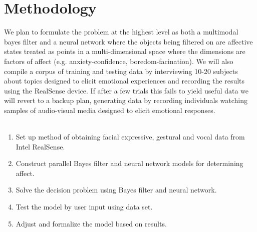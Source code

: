\documentclass[12pt,letterpaper]{article}
\begin{document}
\section{Methodology}
We plan to formulate the problem at the highest level as both a multimodal bayes filter and a neural network where the objects being filtered on are affective states treated as points in a multi-dimensional space where the dimensions are factors of affect (e.g. anxiety-confidence, boredom-facination).  We will also compile a corpus of training and testing data by interviewing 10-20 subjects about topics designed to elicit emotional experiences and recording the results using the RealSense device.  If after a few trials this fails to yield useful data we will revert to a backup plan, generating data by recording individuals watching samples of audio-visual media designed to elicit emotional responses.\\ \\

\begin{enumerate}
\item Set up method of obtaining facial expressive, gestural and vocal data from Intel RealSense.
\item Construct parallel Bayes filter and neural network models for determining affect.
\item Solve the decision problem using Bayes filter and neural network.
\item Test the model by user input using data set.
\item Adjust and formalize the model based on results.
\end{enumerate}

\end{document}
